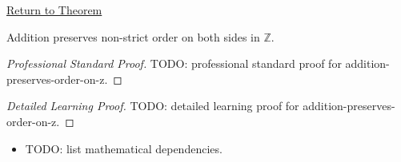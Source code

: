 \newpage
{}
\label{prf:addition-preserves-order-on-z}

\begin{remark*}[Return]
\hyperref[thm:addition-preserves-order-on-z]{Return to Theorem}
\end{remark*}

\begin{theorem*}
Addition preserves non-strict order on both sides in $\mathbb{Z}$.
\end{theorem*}

\begin{proof}[Professional Standard Proof]
\LRAProofBodyStart
TODO: professional standard proof for addition-preserves-order-on-z.
\end{proof}

\begin{proof}[Detailed Learning Proof]
\LRAProofBodyStart
TODO: detailed learning proof for addition-preserves-order-on-z.
\end{proof}

\begin{remark*}
\end{remark*}

\begin{dependencies}
\begin{itemize}
  \item TODO: list mathematical dependencies.
\end{itemize}
\end{dependencies}

\clearpage
